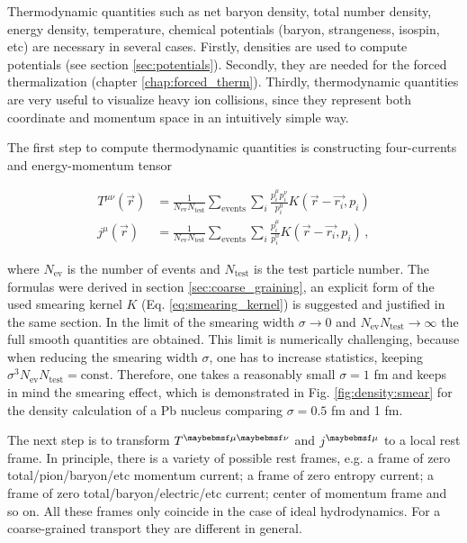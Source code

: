 Thermodynamic quantities such as net baryon density, total number density,
energy density, temperature, chemical potentials (baryon, strangeness, isospin, etc)
are necessary in several cases. Firstly, densities are used to compute potentials
 (see section \ref{sec:potentials}). Secondly, they are needed for the forced thermalization
(chapter \ref{chap:forced_therm}). Thirdly, thermodynamic quantities are very useful
to visualize heavy ion collisions, since they represent both coordinate and momentum
space in an intuitively simple way.


The first step to compute thermodynamic quantities is constructing four-currents
and energy-momentum tensor

\begin{align}
  T^{\mu\nu}(\vec{r}) &= \frac{1}{N_\text{ev} N_\text{test}} \sum_\text{events} \sum_i \frac{p^{\mu}_i p^{\nu}_i}{p^0_i} K(\vec{r} - \vec{r_i}, p_i)  \\
  j^{\mu}(\vec{r})    &= \frac{1}{N_\text{ev} N_\text{test}} \sum_\text{events} \sum_i \frac{p^{\mu}_i}{p^0_i} K(\vec{r} - \vec{r_i}, p_i) \,,
\label{eq:tmn_jmu}
\end{align}

where $N_\text{ev}$ is the number of events and $N_\text{test}$ is the test
particle number. The formulas were derived in section
\ref{sec:coarse_graining}, an explicit form of the used smearing kernel $K$
(Eq. \ref{eq:smearing_kernel}) is suggested and justified in the same section.
In the limit of the smearing width $\sigma \to 0$ and
$N_\text{ev}N_\text{test} \to \infty$ the full smooth quantities are obtained.
This limit is numerically challenging, because when reducing the smearing width
$\sigma$, one has to increase statistics, keeping $\sigma^3
N_\text{ev}N_\text{test}=\text{const}$. Therefore, one takes a reasonably small
$\sigma = 1$ fm and keeps in mind the smearing effect, which is demonstrated in
Fig. \ref{fig:density:smear} for the density calculation of a Pb nucleus comparing
$\sigma = 0.5$ fm and 1 fm.

The next step is to transform $\Tmn$ and $\jmu$ to a local rest frame. In principle,
there is a variety of possible rest frames, e.g. a frame of zero total/pion/baryon/etc
 momentum current; a frame of zero entropy current; a frame of zero total/baryon/electric/etc current;
center of momentum frame and so on. All these frames only coincide in the case of
ideal hydrodynamics. For a coarse-grained transport they are different in general.

